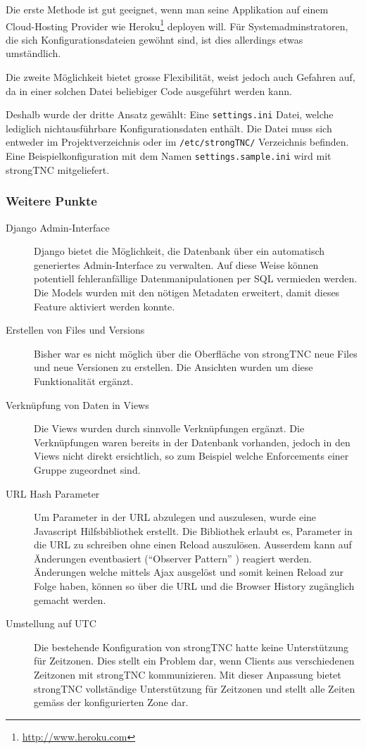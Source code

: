 Die erste Methode ist gut geeignet, wenn man seine Applikation auf einem
Cloud-Hosting Provider wie Heroku\footnote{\url{http://www.heroku.com}} deployen
will. Für Systemadminstratoren, die sich Konfigurationsdateien gewöhnt sind, ist
dies allerdings etwas umständlich.

Die zweite Möglichkeit bietet grosse Flexibilität, weist jedoch auch Gefahren
auf, da in einer solchen Datei beliebiger Code ausgeführt werden kann.

Deshalb wurde der dritte Ansatz gewählt: Eine \texttt{settings.ini} Datei,
welche lediglich nichtausführbare Konfigurationsdaten enthält. Die Datei muss
sich entweder im Projektverzeichnis oder im \texttt{/etc/strongTNC/} Verzeichnis
befinden. Eine Beispielkonfiguration mit dem Namen \texttt{settings.sample.ini}
wird mit strongTNC mitgeliefert.

\subsubsection{Weitere Punkte}
\begin{description}
\item[Django Admin-Interface] Django bietet die Möglichkeit, die Datenbank über
ein automatisch generiertes Admin-Interface zu verwalten. Auf diese Weise
können potentiell fehleranfällige Datenmanipulationen per SQL vermieden
werden. Die Models wurden mit den nötigen Metadaten erweitert, damit dieses
Feature aktiviert werden konnte.

\item[Erstellen von Files und Versions] Bisher war es nicht möglich über die
Oberfläche von strongTNC neue Files und neue Versionen zu erstellen. Die
Ansichten wurden um diese Funktionalität ergänzt.

\item[Verknüpfung von Daten in Views] Die Views wurden durch sinnvolle
Verknüpfungen ergänzt. Die Verknüpfungen waren bereits in der Datenbank
vorhanden, jedoch in den Views nicht direkt ersichtlich, so zum Beispiel welche
Enforcements einer Gruppe zugeordnet sind.

\item[URL Hash Parameter] Um Parameter in der URL abzulegen und auszulesen,
wurde eine Javascript Hilfsbibliothek erstellt. Die Bibliothek erlaubt es,
Parameter in die URL zu schreiben ohne einen Reload auszulösen. Ausserdem kann auf
Änderungen eventbasiert (\enquote{Observer Pattern} \cite{gamma1994design}) reagiert werden. Änderungen welche mittels Ajax ausgelöst und somit keinen Reload zur Folge
haben, können so über die URL und die Browser History zugänglich gemacht werden.

\item[Umstellung auf UTC] Die bestehende Konfiguration von strongTNC hatte keine
Unterstützung für Zeitzonen. Dies stellt ein Problem dar, wenn Clients aus
verschiedenen Zeitzonen mit strongTNC kommunizieren. Mit dieser Anpassung bietet
strongTNC vollständige Unterstützung für Zeitzonen und stellt alle Zeiten gemäss
der konfigurierten Zone dar.

\end{description}
